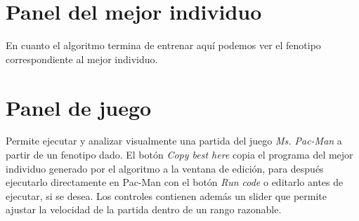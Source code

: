 \section{Panel del mejor individuo}
En cuanto el algoritmo termina de entrenar aquí podemos ver el fenotipo correspondiente al mejor individuo.



\section{Panel de juego}
Permite ejecutar y analizar visualmente una partida del juego \textit{Ms. Pac-Man} a partir de un fenotipo dado. 
El botón \textit{Copy best here} copia el programa del mejor individuo generado por el algoritmo a la ventana de edición, para después ejecutarlo directamente en Pac-Man con el botón \textit{Run code} o editarlo antes de ejecutar, si se desea.
Los controles contienen además un slider que permite ajustar la velocidad de la partida dentro de un rango razonable.
